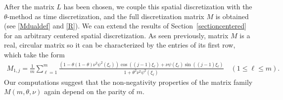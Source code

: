\documentclass[a4paper]{article}
\begin{document}
After the matrix $L$ has been chosen, we couple this spatial discretization with the $\theta$-method as time
discretization, and the full discretization matrix $M$ is obtained (see \eqref{Mdualdef} and \eqref{R}).
We can extend the results of Section~\ref{sectioncentered} for an arbitrary centered spatial discretization.
As seen previously, matrix $M$ is a real, circular matrix so it can be characterized by the entries of its first row,
which take the form
\begin{align}\label{M1j_FD}
	  M_{1,j}  = \frac{1}{m} \sum_{\ell=1}^{m} \frac{\left(1-\theta(1-\theta)\nu^2\psi^2(\xi_\ell)\right)
  \cos((j-1)\xi_\ell) + \nu \psi(\xi_\ell)\sin((j-1)\xi_\ell)}{1+\theta^2\nu^2 \psi^2(\xi_\ell)} \quad (1\le\ell\le m).
\end{align}
Our computations suggest that the non-negativity properties of the matrix family $M(m,\theta,\nu)$ again
depend on the parity of $m$.
\end{document}
